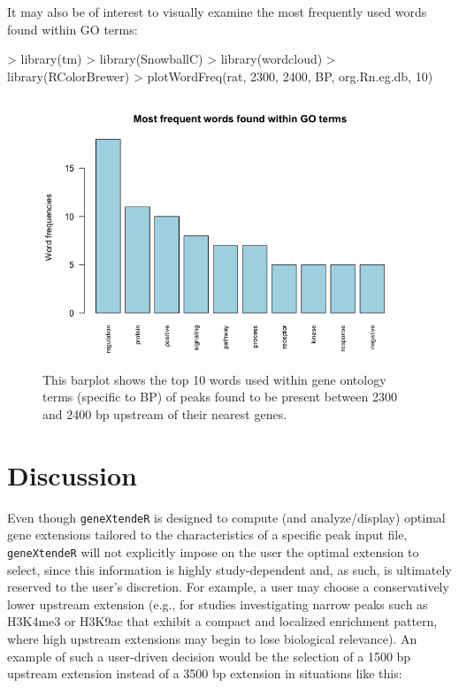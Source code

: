 \documentclass[12pt]{article}
\begin{document}
It may also be of interest to visually examine the most frequently used words found within GO terms:  

\begin{Schunk}
\begin{Sinput}
> library(tm)
> library(SnowballC)
> library(wordcloud)
> library(RColorBrewer)
> plotWordFreq(rat, 2300, 2400, BP, org.Rn.eg.db, 10)
\end{Sinput}
\end{Schunk}

\begin{figure}[H]
\centering
\includegraphics{figures/vignette_wordfreq.png}
\caption{This barplot shows the top 10 words used within gene ontology terms (specific to BP) of peaks found to be present between 2300 and 2400 bp upstream of their nearest genes.}
\end{figure}

\section{Discussion}

Even though \texttt{geneXtendeR} is designed to compute (and analyze/display) optimal gene extensions tailored to the characteristics of a specific peak input file, \texttt{geneXtendeR} will not explicitly impose on the user the optimal extension to select, since this information is highly study-dependent and, as such, is ultimately reserved to the user's discretion.  For example, a user may choose a conservatively lower upstream extension (e.g., for studies investigating narrow peaks such as H3K4me3 or H3K9ac that exhibit a compact and localized enrichment pattern, where high upstream extensions may begin to lose biological relevance).  An example of such a user-driven decision would be the selection of a 1500 bp upstream extension instead of a 3500 bp extension in situations like this:
\end{document}
